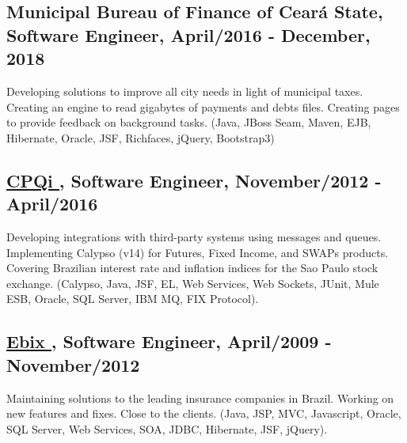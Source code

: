 \documentclass[10pt,a4paper]{article}
\begin{document}
\subsection*{Municipal Bureau of Finance of Ceará State, Software Engineer, April/2016 - December, 2018}

Developing solutions to improve all city needs in light of municipal taxes. Creating an engine to read gigabytes of payments and debts files. Creating pages to provide feedback on background tasks. (Java, JBoss Seam, Maven, EJB, Hibernate, Oracle, JSF, Richfaces, jQuery, Bootstrap3)

\subsection*{\href{https://cpqi.com/}{\uline{CPQi \faExternalLink}}, Software Engineer, November/2012 - April/2016}

Developing integrations with third-party systems using messages and queues. Implementing Calypso (v14) for Futures, Fixed Income, and SWAPs products. Covering Brazilian interest rate and inflation indices for the Sao Paulo stock exchange. (Calypso, Java, JSF, EL, Web Services, Web Sockets, JUnit, Mule ESB, Oracle, SQL Server, IBM MQ, FIX Protocol).

\subsection*{\href{https://www.ebix.com/}{\uline{Ebix \faExternalLink}}, Software Engineer, April/2009 - November/2012}

Maintaining solutions to the leading insurance companies in Brazil. Working on new features and fixes. Close to the clients. (Java, JSP, MVC, Javascript, Oracle, SQL Server, Web Services, SOA, JDBC, Hibernate, JSF, jQuery).

\vspace{2em}
\end{document}
